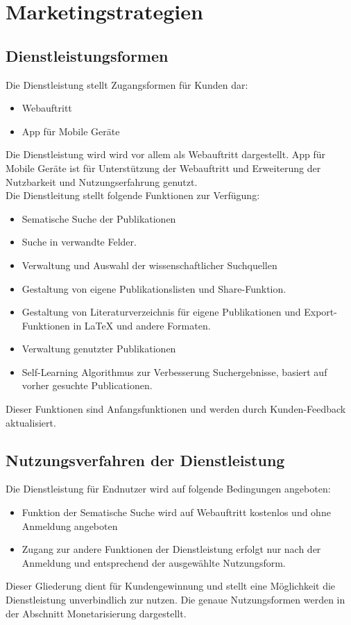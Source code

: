 \section{Marketingstrategien}



\subsection{Dienstleistungsformen}

Die Dienstleistung stellt Zugangsformen für Kunden dar:
\begin{itemize}
\item Webauftritt
\item App für Mobile Geräte
\end{itemize}

Die Dienstleistung wird wird vor allem als Webauftritt dargestellt. App für Mobile Geräte ist für Unterstützung der Webauftritt und Erweiterung der Nutzbarkeit und Nutzungserfahrung genutzt.\\

Die Dienstleitung stellt folgende Funktionen zur Verfügung:
\begin{itemize}
\item Sematische Suche der Publikationen
\item Suche in verwandte Felder. 
\item Verwaltung und Auswahl der wissenschaftlicher Suchquellen
\item Gestaltung von eigene Publikationslisten und Share-Funktion.
\item Gestaltung von Literaturverzeichnis für eigene Publikationen und Export-Funktionen in {\LaTeX} und andere Formaten. 
\item Verwaltung genutzter Publikationen
\item Self-Learning Algorithmus zur Verbesserung Suchergebnisse, basiert auf vorher gesuchte Publicationen.
\end{itemize}

Dieser Funktionen sind Anfangsfunktionen und werden durch Kunden-Feedback aktualisiert. 

\subsection{Nutzungsverfahren der Dienstleistung}
Die Dienstleistung für Endnutzer wird auf folgende Bedingungen angeboten:
\begin{itemize}
\item Funktion der Sematische Suche wird auf Webauftritt kostenlos und ohne Anmeldung angeboten
\item Zugang zur andere Funktionen der Dienstleistung erfolgt nur nach der Anmeldung und entsprechend der ausgewählte Nutzungsform. 
\end{itemize}
Dieser Gliederung dient für Kundengewinnung und stellt eine Möglichkeit die Dienstleistung unverbindlich zur nutzen. Die genaue Nutzungsformen werden in der Abschnitt Monetarisierung dargestellt. 

